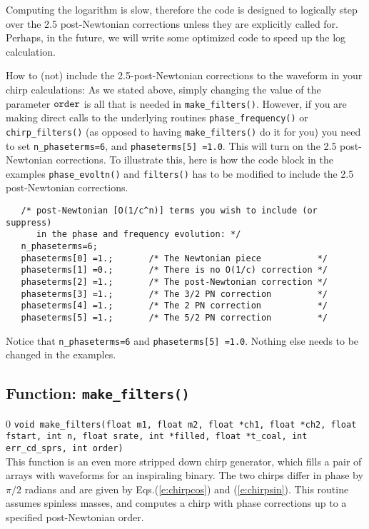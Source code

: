 Computing the logarithm is slow, therefore the code is
designed to logically step over the 2.5 post-Newtonian
corrections unless they are explicitly called for.
Perhaps, in the future, we will write some optimized code
to speed up the log calculation.

How to (not) include the 2.5-post-Newtonian corrections
to the waveform in your chirp calculations:
As we stated above, simply changing the value of 
the parameter ${\tt order}$ is all that is needed
in {\tt make\_filters()}.
However,
if you are making direct calls to the underlying
routines {\tt  phase\_frequency()} or {\tt chirp\_filters()}
(as opposed to having {\tt make\_filters()} do it for you)
you need to set {\tt n\_phaseterms=6},
and {\tt phaseterms[5] =1.0}. 
This will turn on the 2.5 post-Newtonian corrections.
To illustrate this, here is how the code block in the
examples {\tt phase\_evoltn()} and {\tt filters()} 
has to be modified to include
the 2.5 post-Newtonian corrections.

\begin{verbatim}
   /* post-Newtonian [O(1/c^n)] terms you wish to include (or suppress)
      in the phase and frequency evolution: */
   n_phaseterms=6;
   phaseterms[0] =1.;       /* The Newtonian piece           */
   phaseterms[1] =0.;       /* There is no O(1/c) correction */
   phaseterms[2] =1.;       /* The post-Newtonian correction */
   phaseterms[3] =1.;       /* The 3/2 PN correction         */
   phaseterms[4] =1.;       /* The 2 PN correction           */
   phaseterms[5] =1.;       /* The 5/2 PN correction         */
\end{verbatim}

\noindent
Notice that {\tt n\_phaseterms=6} and {\tt phaseterms[5] =1.0}.
Nothing else needs to be changed in the examples.


\clearpage

\subsection{Function: {\tt make\_filters()}}
\label{ss:make_filters}
\setcounter{equation}0
{\tt void make\_filters(float m1, float m2, float *ch1, float *ch2, 
         float fstart, int n, float srate, int *filled, float *t\_coal, int err\_cd\_sprs, int order)}\\
This function is an even more stripped down chirp generator, which
fills a pair of arrays with waveforms for an inspiraling binary.  The
two chirps differ in phase by $\pi/2$ radians and are given by
Eqs.(\ref{e:chirpcos}) and (\ref{e:chirpsin}).  This routine assumes
spinless masses, and computes a chirp with phase corrections
up to a specified post-Newtonian order.

